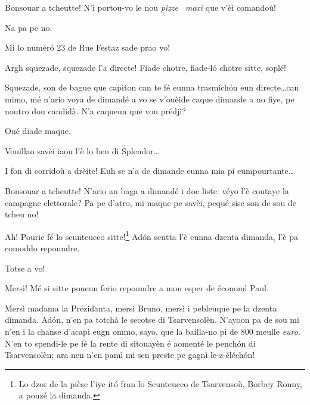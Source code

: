 \begin{drama}

\Fattorinospeaks Bonsouar a tcheutte! N'i portou-vo le nou \textit{pizze} \pizza\ \textit{maxi} que v'èi comandoù!

\Noteospeaks Na pa pe no.

\Fattorinospeaks Mi lo num\'er\'o 23 de Rue Festaz sade prao vo!

\Brunospeaks {} Argh squezade, squezade l'a directe!  Fiade chotre, fiade-l\'o chotre sitte, soplé!


\Brunospeaks {} Squezade, son de bague que capiton can te fé eunna trasmich\'on eun directe\ldots can mimo, mé n'ario voya de dimandé a vo se v'ouèide caque dimande a no fiye, pe noutro dou candidà. N'a caqueun que vou prédjì?


 \Brunospeaks {} Oué diade maque.

\SpectIspeaks Vouillao savèi iaou l'è lo ben di Splendor\ldots

\Brunospeaks I fon di corridoù a drèite! Euh se n'a de dimande eunna mia pi eumpourtante\ldots
 

\SpectIIspeaks Bonsouar a tcheutte! N'ario an baga a di\-man\-dé i doe liste: véyo l'è coutaye la campagne elettorale? Pa pe d’atro, mi maque pe savèi, pequé sise son de sou de tcheu no!

\Brunospeaks Ah! Pourie fé lo seunteucco sitte!\footnote{ Lo dzor de la pièse l'iye it\'o fran lo Seunteucco de Tsarvensoù, Borbey Ronny, a pouzé la dimanda.}  Ad\'on seutta l'è eunna dzenta dimanda, l'è pa comoddo repoundre. 


\Brunospeaks {} Totse a vo!

\Presidanspeaks Mersì! Mé si sitte poueun ferio repoundre a mon esper de économì Paul.

\Dallasspeaks {} Mersì madama la Prézidanta, mer\-sì Bruno, mersì i pebleuque pe la dzenta dimanda. Ad\'on, n'en pa totchà le secotse di Tsarvensolèn. N'ayoon pa de sou mi n'en i la chanse d'acapì eugn ommo, sayo, que la bailla-no pi de 800 meulle \textit{euro}. N'en to spendi-le pe fé la rente di sitouayèn é aomenté le pench\'on di Tsarvensolèn; ara nen n'en pamì mi sen preste pe gagnì le-z-éléch\'on!


\end{drama}
